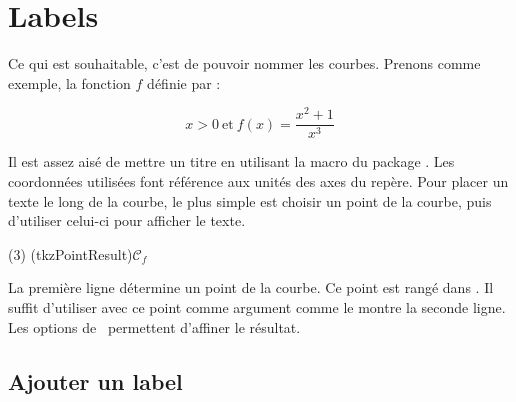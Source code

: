 \section{Labels}

Ce qui est souhaitable, c'est de pouvoir nommer les courbes. Prenons comme exemple, la fonction $f$ définie par :

\[
   x>0\ \text{et}\ f(x)=\dfrac{x^2+1}{x^3}
\]

Il est assez aisé de mettre un titre en utilisant la macro  du package . Les coordonnées utilisées font référence aux unités des axes du repère. Pour placer un texte le long de la courbe, le plus simple est choisir un point de la courbe, puis d'utiliser celui-ci pour afficher le texte.

\begin{tkzltxexample}[num]
  \tkzDefPointByFct(3)
  (tkzPointResult){${\mathcal{C}}_f$}
\end{tkzltxexample}

La première ligne détermine un point de la courbe. Ce point est rangé dans . Il suffit d'utiliser  avec ce point comme argument comme le montre la seconde ligne. Les options de \TIKZ\ permettent d'affiner le résultat.

\subsection{Ajouter un label}

\begin{center}
\begin{tkzexample}[vbox]
\end{tkzexample}
\end{center}


